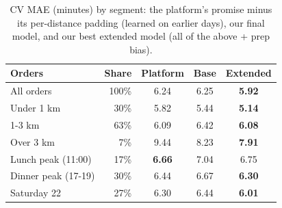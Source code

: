 \begin{table}[t]
\centering
\caption{CV MAE (minutes) by segment: the platform's promise minus its per-distance padding (learned on earlier days), our final model, and our best extended model (all of the above + prep bias).}
\label{tab:extension_platform}
\small
\begin{tabular}{@{}lrccc@{}}
\toprule
Orders & Share & Platform & Base & Extended \\
\midrule
All orders & 100\% & 6.24 & 6.25 & \textbf{5.92} \\
Under 1 km & 30\% & 5.82 & 5.44 & \textbf{5.14} \\
1-3 km & 63\% & 6.09 & 6.42 & \textbf{6.08} \\
Over 3 km & 7\% & 9.44 & 8.23 & \textbf{7.91} \\
Lunch peak (11:00) & 17\% & \textbf{6.66} & 7.04 & 6.75 \\
Dinner peak (17-19) & 30\% & 6.44 & 6.67 & \textbf{6.30} \\
Saturday 22 & 27\% & 6.30 & 6.44 & \textbf{6.01} \\
\bottomrule
\end{tabular}
\end{table}
